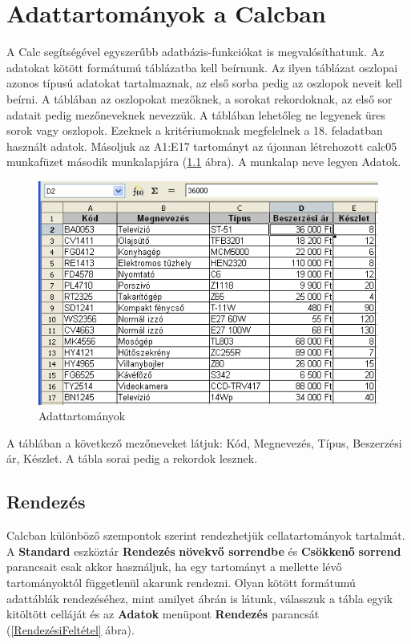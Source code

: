 \chapter{Adattartományok a Calcban}
\thispagestyle{empty}

A Calc segítségével egyszerűbb adatbázis-funkciókat is
megvalósíthatunk. Az adatokat kötött formátumú
táblázatba kell beírnunk. Az ilyen táblázat oszlopai azonos
típusú adatokat tartalmaznak, az első sorba pedig az oszlopok
neveit kell beírni. A táblában az oszlopokat mezőknek, a
sorokat rekordoknak, az első sor adatait pedig mezőneveknek nevezzük. 
A táblában lehetőleg ne legyenek üres sorok vagy
oszlopok. Ezeknek a kritériumoknak megfelelnek a 18. feladatban
használt adatok. Másoljuk az A1:E17 tartományt az újonnan
létrehozott calc05 munkafüzet második munkalapjára (\ref{Adattartományok}
ábra). A munkalap neve legyen Adatok.

\begin{figure}[!h]
\begin{center}
\includegraphics[width=13.679cm]{oocalcv2-img111.png}
\caption{Adattartományok}\label{Adattartományok}
\end{center}
\end{figure}

A táblában a következő mezőneveket látjuk: Kód,
Megnevezés, Típus, Beszerzési ár, Készlet. A tábla sorai
pedig a rekordok lesznek.


\section{Rendezés}

Calcban különböző szempontok szerint rendezhetjük
cellatartományok tartalmát. A \textbf{Standard} eszköztár
\textbf{Rendezés} \textbf{növekvő sorrendbe} és
\textbf{Csökkenő} \textbf{sorrend} parancsait csak akkor
használjuk, ha egy tartományt a mellette lévő
tartományoktól függetlenül akarunk rendezni. Olyan kötött
formátumú adattáblák rendezéséhez, mint amilyet 
ábrán is látunk, válasszuk a tábla egyik kitöltött
celláját és az \textbf{Adatok} menüpont \textbf{Rendezés}
parancsát (\ref{RendezésiFeltétel} ábra).

